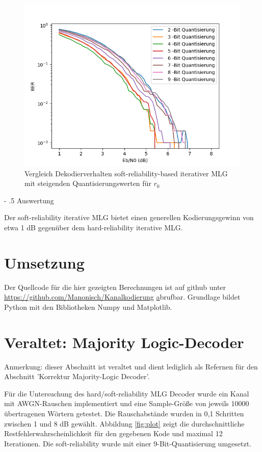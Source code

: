 \documentclass[11pt,a4paper]{article}
\makeatletter
\renewcommand\paragraph{%
\@startsection{paragraph}{4}{0mm}%
{-\baselineskip}%
{.5\baselineskip}%
{\normalfont\normalsize\bfseries}}
\makeatother
\begin{document}
\begin{figure}[ht]
	\includegraphics[width=\linewidth]{x.png}
	\caption{Vergleich Dekodierverhalten soft-reliability-based iterativer MLG mit steigenden Quantisierungswerten für $r_{0}$}
	\label{fig:iter}
\end{figure} 

\paragraph{Auswertung}

Der soft-reliability iterative MLG bietet einen generellen Kodierungsgewinn von etwa 1 dB gegenüber dem hard-reliability iterative MLG.

\section{Umsetzung} Der Quellcode für die hier gezeigten Berechnungen ist auf github unter \url{https://github.com/Manonisch/Kanalkodierung} \href{https://github.com/Manonisch/Kanalkodierung}  abrufbar. Grundlage bildet Python mit den Bibliotheken Numpy und Matplotlib.


\section{Veraltet: Majority Logic-Decoder}

Anmerkung: dieser Abschnitt ist veraltet und dient lediglich als Refernen für den Abschnitt 'Korrektur Majority-Logic Decoder'.

Für die Untersuchung des hard/soft-reliability MLG Decoder wurde ein Kanal mit AWGN-Rauschen implementiert und eine Sample-Größe von jeweils 10000 übertragenen Wörtern getestet.
Die Rauschabstände wurden in 0,1 Schritten zwischen 1 und 8 dB gewählt. Abbildung \ref{fig:plot} zeigt die durchschnittliche Restfehlerwahrscheinlichkeit für den gegebenen Kode und maximal 12 Iterationen. Die soft-reliability wurde mit einer 9-Bit-Quantisierung umgesetzt. 
\end{document}
